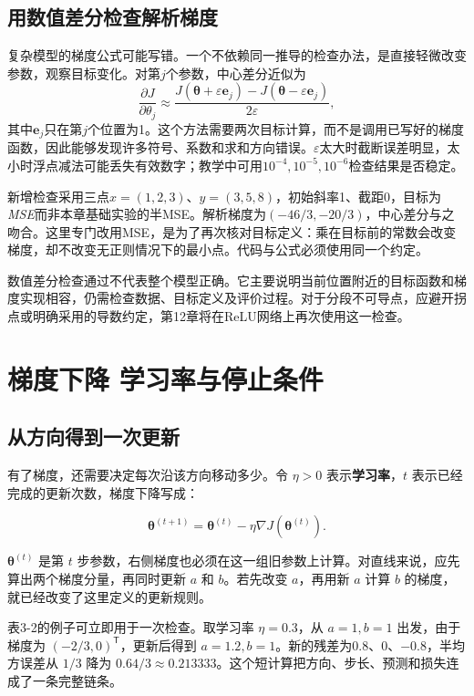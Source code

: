 \subsection{用数值差分检查解析梯度}
复杂模型的梯度公式可能写错。一个不依赖同一推导的检查办法，是直接轻微改变参数，观察目标变化。对第$j$个参数，中心差分近似为
\[
\frac{\partial J}{\partial\theta_j}\approx
\frac{J(\boldsymbol\theta+\varepsilon\mathbf e_j)-J(\boldsymbol\theta-\varepsilon\mathbf e_j)}{2\varepsilon},
\]
其中$\mathbf e_j$只在第$j$个位置为1。这个方法需要两次目标计算，而不是调用已写好的梯度函数，因此能够发现许多符号、系数和求和方向错误。$\varepsilon$太大时截断误差明显，太小时浮点减法可能丢失有效数字；教学中可用$10^{-4},10^{-5},10^{-6}$检查结果是否稳定。

新增检查采用三点$x=(1,2,3)$、$y=(3,5,8)$，初始斜率1、截距0，目标为\emph{MSE}而非本章基础实验的半MSE。解析梯度为$(-46/3,-20/3)$，中心差分与之吻合。这里专门改用MSE，是为了再次核对目标定义：乘在目标前的常数会改变梯度，却不改变无正则情况下的最小点。代码与公式必须使用同一个约定。

数值差分检查通过不代表整个模型正确。它主要说明当前位置附近的目标函数和梯度实现相容，仍需检查数据、目标定义及评价过程。对于分段不可导点，应避开拐点或明确采用的导数约定，第12章将在ReLU网络上再次使用这一检查。

\section{梯度下降 学习率与停止条件}

\subsection{从方向得到一次更新}

有了梯度，还需要决定每次沿该方向移动多少。令 \(\eta > 0\) 表示\textbf{学习率}，\(t\) 表示已经完成的更新次数，梯度下降写成：

\[\mathbf{\theta}^{(t + 1)} = \mathbf{\theta}^{(t)} - \eta\nabla J\left( \mathbf{\theta}^{(t)} \right).\]

\(\mathbf{\theta}^{(t)}\) 是第 \(t\) 步参数，右侧梯度也必须在这一组旧参数上计算。对直线来说，应先算出两个梯度分量，再同时更新 \(a\) 和 \(b\)。若先改变 \(a\)，再用新 \(a\) 计算 \(b\) 的梯度，就已经改变了这里定义的更新规则。

表3-2的例子可立即用于一次检查。取学习率 \(\eta = 0.3\)，从 \(a = 1,b = 1\) 出发，由于梯度为 \(( - 2/3,0)^{\mathsf{T}}\)，更新后得到 \(a = 1.2,b = 1\)。新的残差为0.8、0、\(- 0.8\)，半均方误差从 \(1/3\) 降为 \(0.64/3 \approx 0.213333\)。这个短计算把方向、步长、预测和损失连成了一条完整链条。

